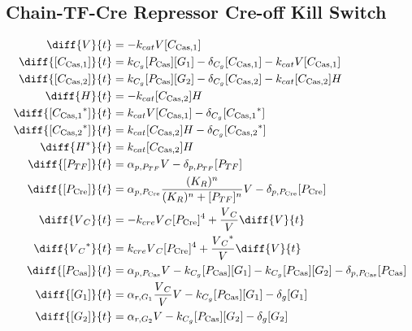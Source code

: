 \subsection{Chain-TF-Cre Repressor Cre-off Kill Switch}
\label{s:Chain_TF_Cre_Repressor_Cre_off_Kill_Switch}

\begin{align}
\diff{\vectorGen{}}{t} & = - \casCutRate{{}}\vectorGen{}\conc{\cplx{\cas}{1}}\\
\diff{\conc{\cplx{\cas}{1}}}{t} & =  \gRnaBind{}\conc{\proSp{\cas{}}}\conc{\gRna{1}} - \casCompDegradeRate{}\conc{\cplx{\cas}{1}} - \casCutRate{{}}\vectorGen{}\conc{\cplx{\cas}{1}}\\
\diff{\conc{\cplx{\cas}{2}}}{t} & =  \gRnaBind{}\conc{\proSp{\cas{}}}\conc{\gRna{2}} - \casCompDegradeRate{}\conc{\cplx{\cas}{2}} - \casCutRate{{}}\conc{\cplx{\cas}{2}}\hostGen{}\\
\diff{\hostGen{}}{t} & = - \casCutRate{{}}\conc{\cplx{\cas}{2}}\hostGen{}\\
\diff{\conc{\bound{\cplx{\cas}{1}}}}{t} & =  \casCutRate{{}}\vectorGen{}\conc{\cplx{\cas}{1}} - \casCompDegradeRate{}\conc{\bound{\cplx{\cas}{1}}}\\
\diff{\conc{\bound{\cplx{\cas}{2}}}}{t} & =  \casCutRate{{}}\conc{\cplx{\cas}{2}}\hostGen{} - \casCompDegradeRate{}\conc{\bound{\cplx{\cas}{2}}}\\
\diff{\edited{\hostGen{}}}{t} & =  \casCutRate{{}}\conc{\cplx{\cas}{2}}\hostGen{}\\
\diff{\conc{\proSp{TF}}}{t} & =  \txtlRate{\proSp{TF}}\vectorGen{} - \proDegradeRate{\proSp{TF}}\conc{\proSp{TF}}\\
\diff{\conc{\proSp{\cre{}}}}{t} & =  \txtlRate{\proSp{\cre{}}}\frac{(K_R)^n}{(K_R)^n + \conc{\proSp{TF}}^n}\vectorGen{} - \proDegradeRate{\proSp{\cre{}}}\conc{\proSp{\cre{}}}\\
\diff{\vectorGen{}_C}{t} & = - \creCutRate{} \vectorGen{}_C \conc{\proSp{\cre{}}}^4 + \frac{\vectorGen{}_C}{\vectorGen{}} \diff{\vectorGen{}}{t}\\
\diff{\edited{\vectorGen{}_C}}{t} & =  \creCutRate{} \vectorGen{}_C \conc{\proSp{\cre{}}}^4 + \frac{\edited{\vectorGen{}_C}}{\vectorGen{}} \diff{\vectorGen{}}{t}\\
\diff{\conc{\proSp{\cas{}}}}{t} & =  \txtlRate{\proSp{\cas{}}}\vectorGen{} - \gRnaBind{}\conc{\proSp{\cas{}}}\conc{\gRna{1}} - \gRnaBind{}\conc{\proSp{\cas{}}}\conc{\gRna{2}} - \proDegradeRate{\proSp{\cas{}}}\conc{\proSp{\cas{}}}\\
\diff{\conc{\gRna{1}}}{t} & =  \txRate{\gRna{1}}\frac{\vectorGen{}_C}{\vectorGen{}}\vectorGen{} - \gRnaBind{}\conc{\proSp{\cas{}}}\conc{\gRna{1}} - \rnaDegradeRate{}\conc{\gRna{1}}\\
\diff{\conc{\gRna{2}}}{t} & =  \txRate{\gRna{2}}\vectorGen{} - \gRnaBind{}\conc{\proSp{\cas{}}}\conc{\gRna{2}} - \rnaDegradeRate{}\conc{\gRna{2}}
\end{align}

